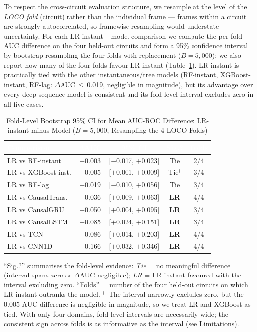 \documentclass[conference,a4paper]{IEEEtran}
\begin{document}
To respect the cross-circuit evaluation structure, we resample at the level of the
\emph{LOCO fold} (circuit) rather than the individual frame — frames within a circuit
are strongly autocorrelated, so framewise resampling would understate uncertainty.
For each LR-instant\,$-$\,model comparison we compute the per-fold AUC difference on the
four held-out circuits and form a 95\% confidence interval by bootstrap-resampling the
four folds with replacement ($B = 5{,}000$); we also report how many of the four folds
favour LR-instant (Table~\ref{tab:bootstrap}).
LR-instant is practically tied with the other instantaneous/tree models
(RF-instant, XGBoost-instant, RF-lag: $\Delta$AUC\,$\leq$\,0.019, negligible in magnitude),
but its advantage over every deep sequence model is consistent and its
fold-level interval excludes zero in all five cases.

\begin{table}[h]
\caption{Fold-Level Bootstrap 95\% CI for Mean AUC-ROC Difference: LR-instant minus Model ($B{=}5{,}000$, Resampling the 4 LOCO Folds)}
\label{tab:bootstrap}
\centering
\small
\renewcommand{\arraystretch}{1.25}
\begin{tabular}{lcccc}
\toprule
\rowcolor{hdrgreen}
\textcolor{white}{\textbf{Comparison}} &
\textcolor{white}{\textbf{$\Delta$AUC}} &
\textcolor{white}{\textbf{95\% CI}} &
\textcolor{white}{\textbf{Sig.?}} &
\textcolor{white}{\textbf{Folds}} \\
\midrule
LR vs RF-instant     & $+$0.003 & [$-$0.017, $+$0.023] & Tie  & 2/4 \\
LR vs XGBoost-inst.  & $+$0.005 & [$+$0.001, $+$0.009] & Tie$^\ddagger$ & 3/4 \\
LR vs RF-lag         & $+$0.019 & [$-$0.010, $+$0.056] & Tie  & 3/4 \\
LR vs CausalTrans.   & $+$0.036 & [$+$0.009, $+$0.063] & \textbf{LR} & 4/4 \\
LR vs CausalGRU      & $+$0.050 & [$+$0.004, $+$0.095] & \textbf{LR} & 3/4 \\
LR vs CausalLSTM     & $+$0.085 & [$+$0.024, $+$0.151] & \textbf{LR} & 3/4 \\
LR vs TCN            & $+$0.086 & [$+$0.014, $+$0.203] & \textbf{LR} & 4/4 \\
LR vs CNN1D          & $+$0.166 & [$+$0.032, $+$0.346] & \textbf{LR} & 4/4 \\
\bottomrule
\end{tabular}
\begin{flushleft}
\footnotesize
``Sig.?'' summarises the fold-level evidence: \emph{Tie} = no meaningful difference
(interval spans zero or $\Delta$AUC negligible); \emph{LR} = LR-instant favoured with the
interval excluding zero. ``Folds'' = number of the four held-out circuits on which
LR-instant outranks the model.
$^\ddagger$~The interval narrowly excludes zero, but the $0.005$ AUC difference is
negligible in magnitude, so we treat LR and XGBoost as tied.
With only four domains, fold-level intervals are necessarily wide; the consistent sign
across folds is as informative as the interval (see Limitations).
\end{flushleft}
\end{table}
\end{document}
